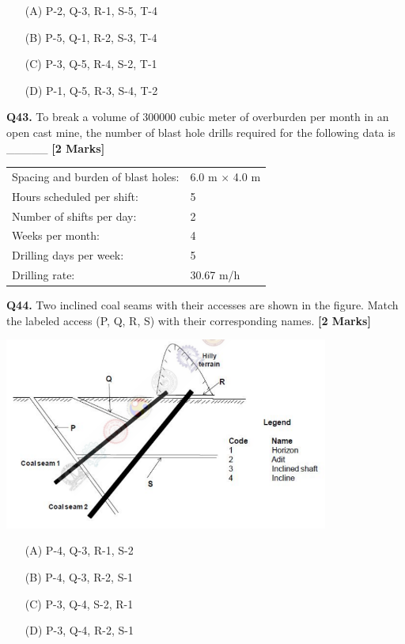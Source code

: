 \documentclass[11pt]{article}
\newcommand{\questionb}[2]{
    \noindent\textbf{Q#2.} #1 \hfill \textbf{[2 Marks]}
}
\begin{document}
\begin{enumerate}
    \item[(A)] P-2, Q-3, R-1, S-5, T-4  
    \item[(B)] P-5, Q-1, R-2, S-3, T-4  
    \item[(C)] P-3, Q-5, R-4, S-2, T-1  
    \item[(D)] P-1, Q-5, R-3, S-4, T-2  
\end{enumerate}
\vspace{0.5cm}

\questionb{To break a volume of 300000 cubic meter of overburden per month in an open cast mine, the number of blast hole drills required for the following data is \_\_\_\_\_}{43}

\begin{tabular}{ll}
Spacing and burden of blast holes: & 6.0 m $\times$ 4.0 m \\
Hours scheduled per shift: & 5 \\
Number of shifts per day: & 2 \\
Weeks per month: & 4 \\
Drilling days per week: & 5 \\
Drilling rate: & 30.67 m/h \\
\end{tabular}
\vspace{0.5cm}

\questionb{Two inclined coal seams with their accesses are shown in the figure. Match the labeled access (P, Q, R, S) with their corresponding names.}{44}

\begin{center}
\includegraphics[width=0.8\textwidth]{figures/44.png}
\end{center}

\begin{enumerate}
    \item[(A)] P-4, Q-3, R-1, S-2
    \item[(B)] P-4, Q-3, R-2, S-1
    \item[(C)] P-3, Q-4, S-2, R-1
    \item[(D)] P-3, Q-4, R-2, S-1
\end{enumerate}
\vspace{0.5cm}
\end{document}
